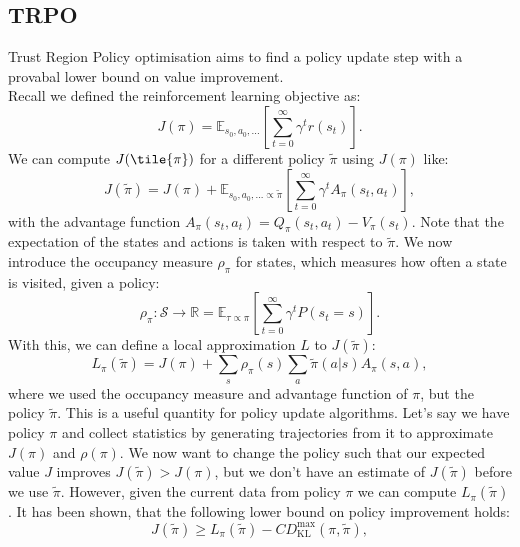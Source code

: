 \subsection{TRPO}
\label{sec:TRPO}
Trust Region Policy optimisation \cite{TRPO} aims to find a policy update step with a provabal lower bound on value improvement.\\ 
Recall we defined the reinforcement learning objective as:
\begin{equation}
    J(\pi) = \mathbb{E}_{s_0, a_0, ...}\left[\sum_{t=0}^{\infty}  \gamma^t r(s_t) \right].
\end{equation}
We can compute $J(\tile{\pi})$ for a different policy $\tilde{\pi}$ using $J(\pi)$ like:
\begin{equation}
    J(\tilde{\pi}) = J(\pi) + \mathbb{E}_{s_0, a_0, ... \propto \tilde{\pi}}\left[ \sum_{t=0}^{\infty}  \gamma^t A_{\pi}(s_t, a_t)\right],
\end{equation}
with the advantage function $A_{\pi}(s_t, a_t) = Q_{\pi}(s_t,a_t) - V_{\pi}(s_t)$. Note that the expectation of the states and actions is taken with respect to 
$\tilde{\pi}$. 
We now introduce the occupancy measure $\rho_{\pi}$ for states, which measures how often a state is visited, given a policy:
\begin{equation*}
    \rho_{\pi}:\mathcal{S} \rightarrow \mathbb{R} = \mathbb{E}_{\tau \propto \pi} \left[ \sum_{t=0}^\infty \gamma^t P(s_t=s) \right].
\end{equation*}
With this, we can define a local approximation $L$ to $J(\tilde{\pi})$:
\begin{equation}
    L_{\pi}(\tilde{\pi}) = J(\pi) + \sum_s \rho_{\pi}(s) \sum_a \tilde{\pi}(a|s) A_{\pi}(s,a),
\end{equation}
where we used the occupancy measure and advantage function of $\pi$, but the policy $\tilde{\pi}$. This is a useful quantity for policy update algorithms. 
Let's say we have policy $\pi$ and collect statistics by generating trajectories from it to approximate $J(\pi)$ and $\rho(\pi)$. We now want to change the policy 
such that our expected value $J$ improves $J(\tilde{\pi}) > J(\pi)$, but we don't have an estimate of $J(\tilde{\pi})$ before we use $\tilde{\pi}$. 
However, given the current data from policy $\pi$ we can compute $L_{\pi}(\tilde{\pi})$. It has been shown, that the following lower bound on policy 
improvement holds:
\begin{equation*}
    J(\tilde{\pi}) \geq L_{\pi}(\tilde{\pi}) - C D^{\max}_{\operatorname{KL}} (\pi,\tilde{\pi}),
\end{equation*}
